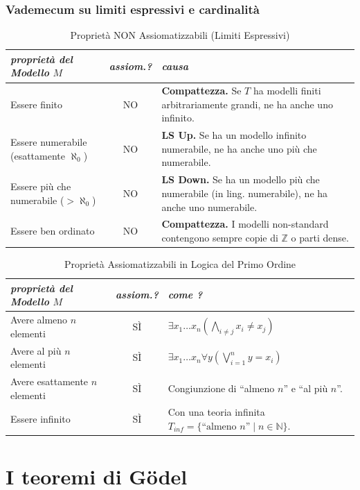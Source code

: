 \documentclass[a4paper,11pt]{report}
\begin{document}
\subsection*{Vademecum su limiti espressivi e cardinalità}
\begin{table}[H]
\centering
\renewcommand{\arraystretch}{1.3}
\begin{tabular}{|l|c|p{8cm}|}
\hline
\textit{proprietà del Modello} $M$ & \textit{assiom.?} & \textit{causa} \\ \hline
Essere finito & NO & \textbf{Compattezza.} Se $T$ ha modelli finiti arbitrariamente grandi, ne ha anche uno infinito. \\ \hline
Essere numerabile (esattamente $\aleph_0$) & NO & \textbf{LS Up.} Se ha un modello infinito numerabile, ne ha anche uno più che numerabile. \\ \hline
Essere più che numerabile ($>\aleph_0$) & NO & \textbf{LS Down.} Se ha un modello più che numerabile (in ling. numerabile), ne ha anche uno numerabile. \\ \hline
Essere ben ordinato & NO & \textbf{Compattezza.} I modelli non-standard contengono sempre copie di $\mathbb{Z}$ o parti dense. \\ \hline
\end{tabular}
\caption{Proprietà NON Assiomatizzabili (Limiti Espressivi)}
\end{table}

\begin{table}[h!]
\centering
\renewcommand{\arraystretch}{1.3}
\begin{tabular}{|l|c|p{8cm}|}
\hline
\textit{proprietà del Modello} $M$ & \textit{assiom.?} & \textit{come ?} \\ \hline
Avere almeno $n$ elementi & SÌ & $\exists x_1 \dots x_n (\bigwedge_{i \neq j} x_i \neq x_j)$ \\ \hline
Avere al più $n$ elementi & SÌ & $\exists x_1 \dots x_n \forall y (\bigvee_{i=1}^n y=x_i)$ \\ \hline
Avere esattamente $n$ elementi & SÌ & Congiunzione di ``almeno $n$'' e ``al più $n$''. \\ \hline
Essere infinito & SÌ & Con una teoria infinita $T_{inf} = \{ \text{``almeno } n \text{''} \mid n \in \mathbb{N} \}$. \\ \hline
\end{tabular}
\caption{Proprietà Assiomatizzabili in Logica del Primo Ordine}
\end{table}


\chapter{I teoremi di Gödel}
\end{document}
